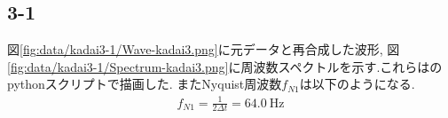 \subsection*{3-1}
図\ref{fig:data/kadai3-1/Wave-kadai3.png}に元データと再合成した波形,
図\ref{fig:data/kadai3-1/Spectrum-kadai3.png}に周波数スペクトルを示す.これらはのpythonスクリプトで描画した.
またNyquist周波数$f_{N1}$は以下のようになる.
\begin{align*}
  f_{N1}=\frac{1}{2\Delta t}=64.0\ \si{\hertz}
\end{align*}
